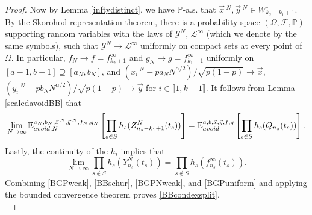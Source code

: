 \begin{proof}
	Now by Lemma \ref{inftydistinct}, we have $\mathbb{P}$-a.s. that $\vec{x}\,^N,\vec{y}\,^N\in W_{k_2-k_1+1}^\circ$. By the Skorohod representation theorem, there is a probability space $(\Omega,\mathcal{F},\mathbb{P})$ supporting random variables with the laws of $\mathcal{Y}^N$, $\mathcal{L}^\infty$ (which we denote by the same symbols), such that $\mathcal{Y}^N \to \mathcal{L}^\infty$ uniformly on compact sets at every point of $\Omega$. In particular, $f_N\to f = f^\infty_{k_2+1}$ and $g_N\to g = f^\infty_{k_1-1}$ uniformly on $[a-1,b+1]\supseteq [a_N,b_N]$, and $(x_i\,^N - pa_N N^{\alpha/2})/\sqrt{p(1-p)}\to\vec{x}$, $(y_i\,^N-pb_N N^{\alpha/2})/\sqrt{p(1-p)}\to\vec{y}$ for $i\in\llbracket 1,k-1\rrbracket$. It follows from Lemma \ref{scaledavoidBB} that 
	\begin{equation}\label{BGPNweak}
	\lim_{N\to\infty} \mathbb{E}^{a_N,b_N,\vec{x}\,^N,\vec{y}\,^N,f_N,g_N}_{avoid,N}\left[\prod_{s\in S} h_s(Z^N_{n_s-k_1+1}(t_s))\right] = \mathbb{E}^{a,b,\vec{x},\vec{y},f,g}_{avoid}\left[\prod_{s\in S} h_s(Q_{n_s}(t_s))\right].
	\end{equation}
	Lastly, the continuity of the $h_i$ implies that
	\begin{equation}\label{BGPuniform}
	\lim_{N\to\infty}\prod_{s\notin S} h_s(Y_{n_s}^N(t_s)) = \prod_{s\notin S} h_s(f^\infty_{n_s}(t_s)).
	\end{equation}
	Combining \eqref{BGPweak}, \eqref{BBschur}, \eqref{BGPNweak}, and \eqref{BGPuniform} and applying the bounded convergence theorem proves \eqref{BBcondexsplit}.\\
	

\end{proof}
